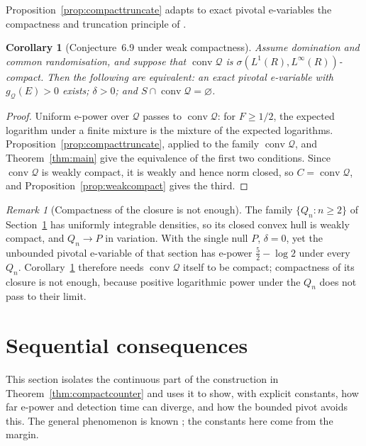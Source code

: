 \documentclass[11pt,a4paper]{article}
\newtheorem{corollary}[theorem]{Corollary}
\theoremstyle{definition}
\theoremstyle{remark}
\newtheorem{remark}[theorem]{Remark}
\newcommand{\QQ}{\mathcal Q}
\newcommand{\conv}{\operatorname{conv}}
\begin{document}
Proposition~\ref{prop:compacttruncate} adapts to exact pivotal e-variables the compactness and truncation principle of \cite[Theorem~4.17]{GROW}.

\begin{corollary}[Conjecture~6.9 under weak compactness]\label{cor:conjcompact}
Assume domination and common randomisation, and suppose that \(\conv\QQ\) is \(\sigma(L^1(R),L^\infty(R))\)-compact. Then the following are equivalent: an exact pivotal e-variable with \(g_{\QQ}(E)>0\) exists; \(\delta>0\); and \(S\cap\conv\QQ=\varnothing\).
\end{corollary}
\begin{proof}
Uniform e-power over \(\QQ\) passes to \(\conv\QQ\): for \(F\ge1/2\), the expected logarithm under a finite mixture is the mixture of the expected logarithms. Proposition~\ref{prop:compacttruncate}, applied to the family \(\conv\QQ\), and Theorem~\ref{thm:main} give the equivalence of the first two conditions. Since \(\conv\QQ\) is weakly compact, it is weakly and hence norm closed, so \(C=\conv\QQ\), and Proposition~\ref{prop:weakcompact} gives the third.
\end{proof}

\begin{remark}[Compactness of the closure is not enough]\label{rem:closure}
The family \(\{Q_n:n\ge2\}\) of Section~\ref{sec:sequential} has uniformly integrable densities, so its closed convex hull is weakly compact, and \(Q_n\to P\) in variation. With the single null \(P\), \(\delta=0\), yet the unbounded pivotal e-variable of that section has e-power \(\tfrac52-\log2\) under every \(Q_n\). Corollary~\ref{cor:conjcompact} therefore needs \(\conv\QQ\) itself to be compact; compactness of its closure is not enough, because positive logarithmic power under the \(Q_n\) does not pass to their limit.
\end{remark}

\section{Sequential consequences}\label{sec:sequential}

This section isolates the continuous part of the construction in Theorem~\ref{thm:compactcounter} and uses it to show, with explicit constants, how far e-power and detection time can diverge, and how the bounded pivot avoids this. The general phenomenon is known \cite{Forre}; the constants here come from the margin.
\end{document}
